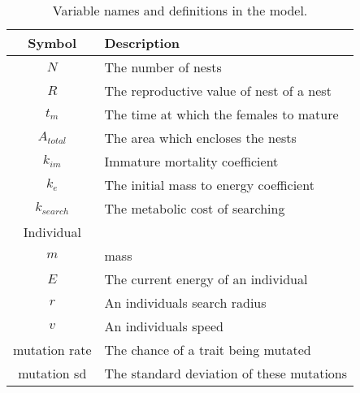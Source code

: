 \documentclass[a4paper,11pt]{article}
\begin{document}
\clearpage
\begin{table}[h!]
    \caption{Variable names and definitions in the model.}
    \centering
    \begin{tabular}{c | l }
        \hline
        Symbol & Description\\
        \hline
        \hline
        $N$ &  The number of nests \\
        $R$ &  The reproductive value of nest of a nest\\
        $t_m$  & The time at which the females to mature\\
        $A_{total}$ & The area which encloses the nests\\
        \hline
        $k_{im}$ & Immature mortality coefficient \\
        $k_e$ & The initial mass to energy coefficient \\
        $k_{search}$ & The metabolic cost of searching \\
        \hline
        Individual & \\
        \hline
        $m$ & mass\\
        $E$ & The current energy of an individual\\
        $r$ & An individuals search radius\\
        $v$ & An individuals speed\\ 
        \hline
        mutation rate & The chance of a trait being mutated\\
        mutation sd & The standard deviation of  these mutations\\
        \hline
    \end{tabular}
\end{table}


\end{document}
